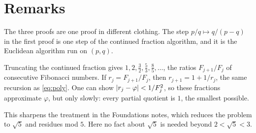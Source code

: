 \documentclass[11pt,a4paper]{article}
\begin{document}
\section{Remarks}

\begin{remark}
  The three proofs are one proof in different clothing. The step $p/q \mapsto q/(p-q)$
  in the first proof is one step of the continued fraction algorithm, and it is the
  Euclidean algorithm run on $(p, q)$.
\end{remark}

\begin{remark}
  Truncating the continued fraction gives $1, 2, \frac32, \frac53, \frac85, \dotsc$,
  the ratios $F_{j+1}/F_j$ of consecutive Fibonacci numbers. If $r_j = F_{j+1}/F_j$,
  then $r_{j+1} = 1 + 1/r_j$, the same recursion as \eqref{eq:poly}. One can show
  $\lvert r_j - \varphi\rvert < 1/F_j^2$, so these fractions approximate $\varphi$, but only
  slowly: every partial quotient is $1$, the smallest possible.
\end{remark}

\begin{remark}
  This sharpens the treatment in the Foundations notes, which reduces the problem to
  $\sqrt5$ and residues mod $5$. Here no fact about $\sqrt5$ is needed beyond
  $2 < \sqrt5 < 3$.
\end{remark}
\end{document}
